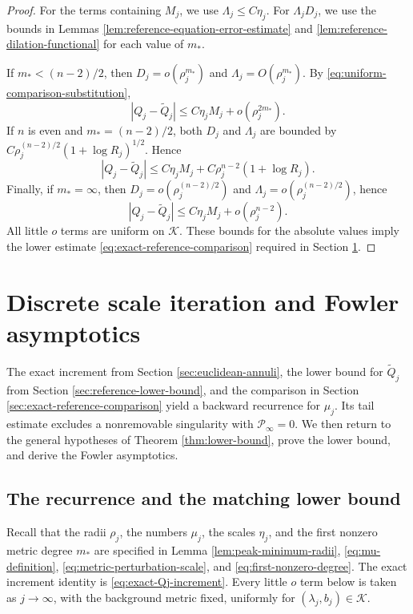 \documentclass[11pt]{article}
\numberwithin{equation}{section}
\theoremstyle{remark}
\newcommand{\cP}{\mathcal P}
\begin{document}
\begin{proof}
For the terms containing \(M_j\), we use
\(\Lambda_j\le C\eta_j\). For \(\Lambda_jD_j\), we use the bounds in
Lemmas  \ref{lem:reference-equation-error-estimate} and
\ref{lem:reference-dilation-functional} for each value of \(m_*\).

If \(m_*<(n-2)/2\), then
\(D_j=o(\rho_j^{m_*})\) and \(\Lambda_j=O(\rho_j^{m_*})\).
By  \eqref{eq:uniform-comparison-substitution},
\[
 |Q_j-\widetilde Q_j|
 \le C\eta_jM_j+o(\rho_j^{2m_*}).
\]
If \(n\) is even and \(m_*=(n-2)/2\), both \(D_j\) and \(\Lambda_j\)
are bounded by
\(C\rho_j^{(n-2)/2}(1+\log R_j)^{1/2}\). Hence
\[
 |Q_j-\widetilde Q_j|
 \le C\eta_jM_j+C\rho_j^{n-2}(1+\log R_j).
\]
Finally, if \(m_*=\infty\), then
\(D_j=o(\rho_j^{(n-2)/2})\) and
\(\Lambda_j=o(\rho_j^{(n-2)/2})\), hence
\[
 |Q_j-\widetilde Q_j|
 \le C\eta_jM_j+o(\rho_j^{n-2}).
\]
All little \(o\) terms are uniform on \(\mathcal K\).
These bounds for the absolute values imply the lower estimate
\eqref{eq:exact-reference-comparison} required in Section  \ref{sec:recurrence}.
\end{proof}

\par
\section{Discrete scale iteration and Fowler asymptotics}\label{sec:recurrence}
\label{sec:fowler}

The exact increment from Section  \ref{sec:euclidean-annuli}, the lower
bound for \(\widetilde Q_j\) from Section  \ref{sec:reference-lower-bound},
and the comparison in Section  \ref{sec:exact-reference-comparison} yield
a backward recurrence for \(\mu_j\). Its tail estimate excludes a
nonremovable singularity with \(\cP_\infty=0\). We then return to the
general hypotheses of
Theorem  \ref{thm:lower-bound}, prove the lower bound, and derive the Fowler
asymptotics.

\subsection{The recurrence and the matching lower bound}
Recall that the radii \(\rho_j\), the numbers \(\mu_j\), the scales
\(\eta_j\), and the first nonzero metric degree \(m_*\) are specified in
Lemma  \ref{lem:peak-minimum-radii}, \eqref{eq:mu-definition},
\eqref{eq:metric-perturbation-scale}, and \eqref{eq:first-nonzero-degree}. The exact
increment identity is \eqref{eq:exact-Qj-increment}. Every little \(o\) term
below is taken as \(j\to\infty\), with the background metric fixed,
uniformly for \((\lambda_j,b_j)\in\mathcal K\).
\end{document}
